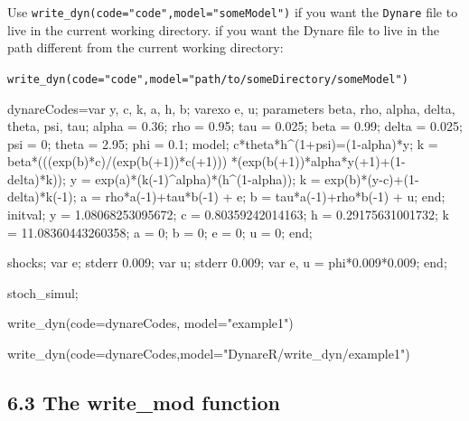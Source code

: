 \documentclass[
  12pt,
  legalpaperpaper,
  DIV=11,
  numbers=noendperiod]{scrartcl}
\newenvironment{Shaded}{\begin{snugshade}}{\end{snugshade}}
\newcommand{\AttributeTok}[1]{\textcolor[rgb]{0.40,0.45,0.13}{#1}}
\newcommand{\FunctionTok}[1]{\textcolor[rgb]{0.28,0.35,0.67}{#1}}
\newcommand{\NormalTok}[1]{\textcolor[rgb]{0.00,0.23,0.31}{#1}}
\newcommand{\OtherTok}[1]{\textcolor[rgb]{0.00,0.23,0.31}{#1}}
\newcommand{\StringTok}[1]{\textcolor[rgb]{0.13,0.47,0.30}{#1}}
\begin{document}
Use \texttt{write\_dyn(code="code",model="someModel")} if you want the
\texttt{Dynare} file to live in the current working directory. if you
want the Dynare file to live in the path different from the current
working directory:

\texttt{write\_dyn(code="code",model="path/to/someDirectory/someModel")}

\begin{Shaded}
\begin{Highlighting}[]
\NormalTok{dynareCodes}\OtherTok{=}\StringTok{\textquotesingle{}var y, c, k, a, h, b;}
\StringTok{varexo e, u;}
\StringTok{parameters beta, rho, alpha, delta, theta, psi, tau;}
\StringTok{alpha = 0.36;}
\StringTok{rho   = 0.95;}
\StringTok{tau   = 0.025;}
\StringTok{beta  = 0.99;}
\StringTok{delta = 0.025;}
\StringTok{psi   = 0;}
\StringTok{theta = 2.95;}
\StringTok{phi   = 0.1;}
\StringTok{model;}
\StringTok{c*theta*h\^{}(1+psi)=(1{-}alpha)*y;}
\StringTok{k = beta*(((exp(b)*c)/(exp(b(+1))*c(+1)))}
\StringTok{          *(exp(b(+1))*alpha*y(+1)+(1{-}delta)*k));}
\StringTok{y = exp(a)*(k({-}1)\^{}alpha)*(h\^{}(1{-}alpha));}
\StringTok{k = exp(b)*(y{-}c)+(1{-}delta)*k({-}1);}
\StringTok{a = rho*a({-}1)+tau*b({-}1) + e;}
\StringTok{b = tau*a({-}1)+rho*b({-}1) + u;}
\StringTok{end;}
\StringTok{initval;}
\StringTok{y = 1.08068253095672;}
\StringTok{c = 0.80359242014163;}
\StringTok{h = 0.29175631001732;}
\StringTok{k = 11.08360443260358;}
\StringTok{a = 0;}
\StringTok{b = 0;}
\StringTok{e = 0;}
\StringTok{u = 0;}
\StringTok{end;}

\StringTok{shocks;}
\StringTok{var e; stderr 0.009;}
\StringTok{var u; stderr 0.009;}
\StringTok{var e, u = phi*0.009*0.009;}
\StringTok{end;}

\StringTok{stoch\_simul;\textquotesingle{}}


\FunctionTok{write\_dyn}\NormalTok{(}\AttributeTok{code=}\NormalTok{dynareCodes, }\AttributeTok{model=}\StringTok{"example1"}\NormalTok{)}

\FunctionTok{write\_dyn}\NormalTok{(}\AttributeTok{code=}\NormalTok{dynareCodes,}\AttributeTok{model=}\StringTok{"DynareR/write\_dyn/example1"}\NormalTok{)}
\end{Highlighting}
\end{Shaded}

\hypertarget{the-write_mod-function}{%
\subsection{6.3 The write\_mod function}\label{the-write_mod-function}}
\end{document}
